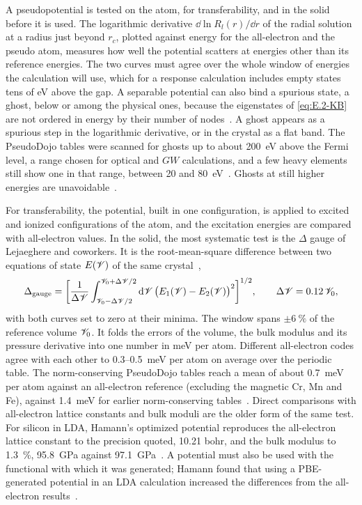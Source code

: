 A pseudopotential is tested on the atom, for transferability, and in the solid before it is used. The logarithmic derivative $\dd\ln R_l(r)/\dd r$ of the radial solution at a radius just beyond $r_c$, plotted against energy for the all-electron and the pseudo atom, measures how well the potential scatters at energies other than its reference energies. The two curves must agree over the whole window of energies the calculation will use, which for a response calculation includes empty states tens of eV above the gap. A separable potential can also bind a spurious state, a ghost, below or among the physical ones, because the eigenstates of \cref{eq:E.2-KB} are not ordered in energy by their number of nodes~\cite{hamann2013optimized}. A ghost appears as a spurious step in the logarithmic derivative, or in the crystal as a flat band. The PseudoDojo tables were scanned for ghosts up to about \SI{200}{eV} above the Fermi level, a range chosen for optical and $GW$ calculations, and a few heavy elements still show one in that range, between 20 and \SI{80}{eV}~\cite[Table~8]{vansetten2018pseudodojo}. Ghosts at still higher energies are unavoidable~\cite{vansetten2018pseudodojo}.

For transferability, the potential, built in one configuration, is applied to excited and ionized configurations of the atom, and the excitation energies are compared with all-electron values. In the solid, the most systematic test is the $\Delta$ gauge of Lejaeghere and coworkers. It is the root-mean-square difference between two equations of state $E(\mathscr{V})$ of the same crystal~\cite[Eq.~(15)]{lejaeghere2014error},
\begin{equation}
  \Delta_{\mathrm{gauge}} = \biggl[\frac{1}{\Delta \mathscr{V}}\int_{\mathscr{V}_0 - \Delta \mathscr{V}/2}^{\mathscr{V}_0 + \Delta \mathscr{V}/2}\mathrm{d} \mathscr{V}\,\bigl(E_1(\mathscr{V}) - E_2(\mathscr{V})\bigr)^2\biggr]^{1/2} , \qquad \Delta \mathscr{V} = 0.12\,\mathscr{V}_0 ,
  \label{eq:E.2-delta}
\end{equation}
with both curves set to zero at their minima. The window spans $\pm\SI{6}{\percent}$ of the reference volume $\mathscr{V}_0$. It folds the errors of the volume, the bulk modulus and its pressure derivative into one number in meV per atom. Different all-electron codes agree with each other to 0.3--\SI{0.5}{meV} per atom on average over the periodic table. The norm-conserving PseudoDojo tables reach a mean of about \SI{0.7}{meV} per atom against an all-electron reference (excluding the magnetic Cr, Mn and Fe), against \SI{1.4}{meV} for earlier norm-conserving tables~\cite{vansetten2018pseudodojo}. Direct comparisons with all-electron lattice constants and bulk moduli are the older form of the same test. For silicon in LDA, Hamann's optimized potential reproduces the all-electron lattice constant to the precision quoted, 10.21 bohr, and the bulk modulus to \SI{1.3}{\percent}, \SI{95.8}{GPa} against \SI{97.1}{GPa}~\cite[Table~I]{hamann2013optimized}. A potential must also be used with the functional with which it was generated; Hamann found that using a PBE-generated potential in an LDA calculation increased the differences from the all-electron results~\cite{hamann2013optimized}.

